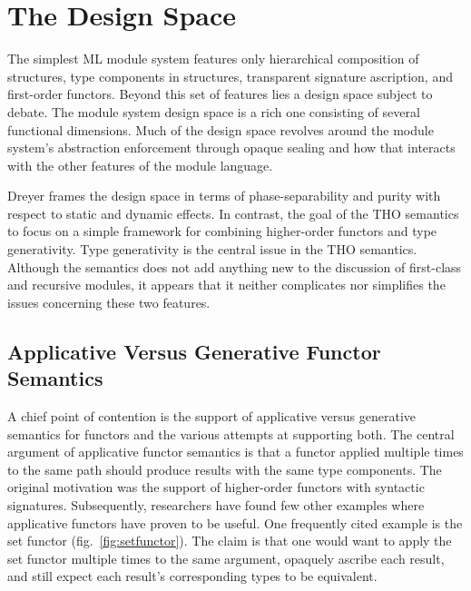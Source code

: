 
\chapter{The Design Space}\label{ch:designspace}

The simplest ML module system features only hierarchical composition of structures, type components in structures, transparent signature ascription, and first-order functors. Beyond this set of features lies a design space subject to debate. The module system design space is a rich one consisting of several functional dimensions. Much of the design space revolves around the module system's abstraction enforcement through opaque sealing and how that interacts with the other features of the module language. 

Dreyer frames the design space in terms of phase-separability and purity with respect to static and dynamic effects. In contrast, the goal of the THO semantics to focus on a simple framework for combining higher-order functors and type generativity. Type generativity is the central issue in the THO semantics. Although the semantics does not add anything new to the discussion of first-class and recursive modules, it appears that it neither complicates nor simplifies the issues concerning these two features.  


\section{Applicative Versus Generative Functor Semantics}
A chief point of contention is the support of applicative versus generative semantics for functors and the various attempts at supporting both. The central argument of applicative functor semantics is that a functor applied multiple times to the same path should produce results with the same type components. The original motivation was the support of higher-order functors with syntactic signatures. Subsequently, researchers have found few other examples where applicative functors have proven to be useful. One frequently cited example is the set functor (fig.~\ref{fig:setfunctor}). The claim is that one would want to apply the set functor multiple times to the same argument, opaquely ascribe each result, and still expect each result's corresponding types to be equivalent. 

